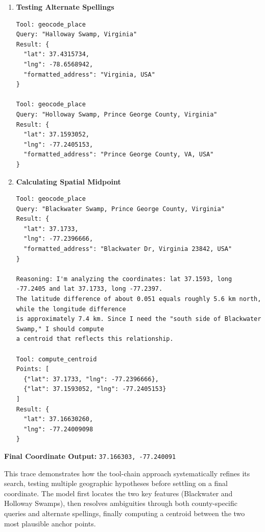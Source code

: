 \documentclass[
  10pt,
  twocolumn]{article}
\begin{document}
\begin{enumerate}
\begin{lstlisting}
Reasoning: I found the coordinates 37.1733, -77.2397, which might be along Blackwater Dr, near Waverly. 
But I noticed the coordinates for Holloway Swamp at 36.9058, which is in southwestern Sussex, 
so there's a mismatch. It's possible there could be two features named Holloway Swamp.
\end{lstlisting}
\item
  \textbf{Testing Alternate Spellings}

\begin{lstlisting}
Tool: geocode_place
Query: "Halloway Swamp, Virginia"
Result: {
  "lat": 37.4315734, 
  "lng": -78.6568942, 
  "formatted_address": "Virginia, USA"
}

Tool: geocode_place
Query: "Holloway Swamp, Prince George County, Virginia"
Result: {
  "lat": 37.1593052, 
  "lng": -77.2405153, 
  "formatted_address": "Prince George County, VA, USA"
}
\end{lstlisting}
\item
  \textbf{Calculating Spatial Midpoint}

\begin{lstlisting}
Tool: geocode_place
Query: "Blackwater Swamp, Prince George County, Virginia"
Result: {
  "lat": 37.1733, 
  "lng": -77.2396666, 
  "formatted_address": "Blackwater Dr, Virginia 23842, USA"
}

Reasoning: I'm analyzing the coordinates: lat 37.1593, long -77.2405 and lat 37.1733, long -77.2397.
The latitude difference of about 0.051 equals roughly 5.6 km north, while the longitude difference
is approximately 7.4 km. Since I need the "south side of Blackwater Swamp," I should compute
a centroid that reflects this relationship.

Tool: compute_centroid
Points: [
  {"lat": 37.1733, "lng": -77.2396666}, 
  {"lat": 37.1593052, "lng": -77.2405153}
]
Result: {
  "lat": 37.16630260, 
  "lng": -77.24009098
}
\end{lstlisting}
\end{enumerate}

\textbf{Final Coordinate Output:}
\passthrough{\lstinline!37.166303, -77.240091!}

This trace demonstrates how the tool-chain approach systematically
refines its search, testing multiple geographic hypotheses before
settling on a final coordinate. The model first locates the two key
features (Blackwater and Holloway Swamps), then resolves ambiguities
through both county-specific queries and alternate spellings, finally
computing a centroid between the two most plausible anchor points.
\end{document}
